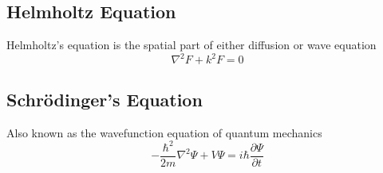 \documentclass[../main.tex]{subfiles}
\begin{document}
\subsection*{Helmholtz Equation}
Helmholtz's equation is the spatial part of either diffusion or wave equation
\begin{equation*}
    \nabla^2F+k^2F=0
\end{equation*}

\subsection*{Schrödinger's Equation}
Also known as the wavefunction equation of quantum mechanics
\begin{equation*}
    -\frac{\hbar^2}{2m}\nabla^2\Psi+V\Psi= i\hbar\frac{\partial \Psi}{\partial t}
\end{equation*}
\end{document}
